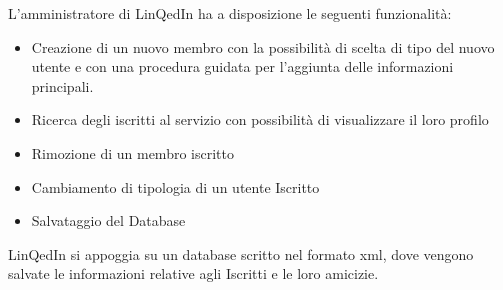 L'amministratore di LinQedIn ha a disposizione le seguenti funzionalit\`a:
\begin{itemize}

\item Creazione di un nuovo membro con la possibilit\`a di scelta di tipo
  del nuovo utente e con una procedura guidata per l'aggiunta delle
  informazioni principali.

\item Ricerca degli iscritti al servizio con possibilit\`a di visualizzare
  il loro profilo

\item Rimozione di un membro iscritto

\item Cambiamento di tipologia di un utente Iscritto

\item Salvataggio del Database

\end{itemize}

LinQedIn si appoggia su un database scritto nel formato xml, dove vengono
salvate le informazioni relative agli Iscritti e le loro amicizie.

